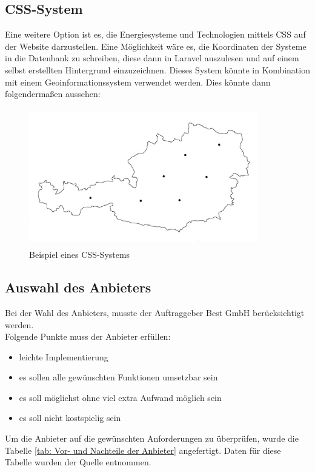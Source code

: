 \subsection{CSS-System}
Eine weitere Option ist es, die Energiesysteme und Technologien mittels CSS auf der Website darzustellen. Eine Möglichkeit wäre es, die Koordinaten der Systeme in die Datenbank zu schreiben, diese dann in Laravel auszulesen und auf einem selbst erstellten Hintergrund  einzuzeichnen. Dieses System könnte in Kombination mit einem Geoinformationssystem verwendet werden. Dies könnte dann folgendermaßen aussehen: 

\begin{figure}[h]
	\centering
	\includegraphics[height=6cm,width=10cm]{images/CSS_System}
	\caption{Beispiel eines CSS-Systems}
	\label{fig:CSS_System}
\end{figure}

\newpage
\subsection{Auswahl des Anbieters}
	Bei der Wahl des Anbieters, musste der Auftraggeber Best GmbH berücksichtigt werden. \\Folgende Punkte muss der Anbieter erfüllen:
	\begin{itemize}
		\item leichte Implementierung 
		\item es sollen alle gewünschten Funktionen umsetzbar sein 
		\item es soll möglichst ohne viel extra Aufwand möglich sein  
		\item es soll nicht kostspielig sein 
	\end{itemize}

Um die Anbieter auf die gewünschten Anforderungen zu überprüfen, wurde die Tabelle \ref{tab: Vor- und Nachteile der Anbieter} angefertigt. Daten für diese Tabelle wurden der Quelle \cite{GvsS} \space entnommen.

